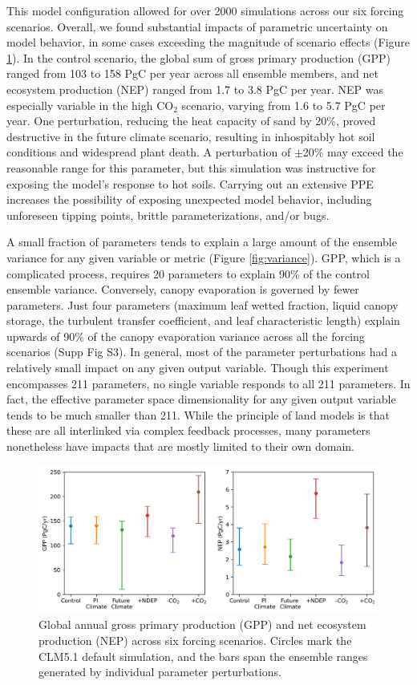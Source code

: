 \documentclass[draft]{agujournal2019}
\begin{document}
This model configuration allowed for over 2000 simulations across our six forcing scenarios.
Overall, we found substantial impacts of parametric uncertainty on model behavior, in some cases exceeding the magnitude of scenario effects (Figure \ref{fig:ranges}). In the control scenario, the global sum of gross primary production (GPP) ranged from 103 to 158 PgC per year across all ensemble members, and net ecosystem production (NEP) ranged from 1.7 to 3.8 PgC per year. NEP was especially variable in the high CO$_2$ scenario, varying from 1.6 to 5.7 PgC per year. One perturbation, reducing the heat capacity of sand by 20\%, proved destructive in the future climate scenario, resulting in inhospitably hot soil conditions and widespread plant death. A perturbation of $\pm$20\% may exceed the reasonable range for this parameter, but this simulation was instructive for exposing the model's response to hot soils. Carrying out an extensive PPE increases the possibility of exposing unexpected model behavior, including unforeseen tipping points, brittle parameterizations, and/or bugs.

A small fraction of parameters tends to explain a large amount of the ensemble variance for any given variable or metric (Figure \ref{fig:variance}). GPP, which is a complicated process, requires 20 parameters to explain 90\% of the control ensemble variance. Conversely, canopy evaporation is governed by fewer parameters.  Just four parameters (maximum leaf wetted fraction, liquid canopy storage, the turbulent transfer coefficient, and leaf characteristic length) explain upwards of 90\% of the canopy evaporation variance across all the forcing scenarios (Supp Fig S3). In general, most of the parameter perturbations had a relatively small impact on any given output variable. Though this experiment encompasses 211 parameters, no single variable responds to all 211 parameters. In fact, the effective parameter space dimensionality for any given output variable tends to be much smaller than 211. While the principle of land models is that these are all interlinked via complex feedback processes, many parameters nonetheless have impacts that are mostly limited to their own domain. 

\begin{figure}[h]
\centering
\includegraphics[width=\textwidth]{../figs/ranges.png}
\caption{Global annual gross primary production (GPP) and net ecosystem production (NEP) across six forcing scenarios. Circles mark the CLM5.1 default simulation, and the bars span the ensemble ranges generated by individual parameter perturbations.}
\label{fig:ranges}
\end{figure}
\end{document}
